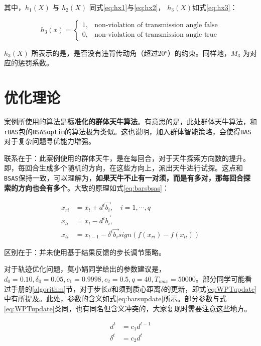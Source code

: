 \documentclass[]{ctexbook}
\theoremstyle{definition}
\theoremstyle{definition}
\theoremstyle{definition}
\theoremstyle{remark}
\begin{document}
其中，\(h_1(X)\) 与 \(h_2(X)\) 同式\eqref{eq:hx1}与\eqref{eq:hx2}，
\(h_3(X)\)如式\eqref{eq:hx3}：

\begin{equation}
h_3(x) = \begin{cases}
1, & \text{non-violation of transmission angle false}\\
0, & \text{non-violation of transmission angle true}
\end{cases}
\label{eq:hx3}
\end{equation}

\(h_3(X)\)
所表示的是，是否没有违背传动角（超过20°）的约束。同样地，\(M_3\)
为对应的惩罚系数。

\section{优化理论}

案例所使用的算法是\textbf{标准化的群体天牛算法}。有意思的是，此处群体天牛算法，和\texttt{rBAS}包的\texttt{BSASoptim}的算法极为类似。这也说明，加入群体智能策略，会使得\texttt{BAS}对于复杂问题寻优能力增强。

联系在于：此案例使用的群体天牛，是在每回合，对于天牛探索方向数的提升。即，每回合生成多个随机的方向，在这些方向上，派出天牛进行试探。这点和\texttt{BSAS}保持一致，可以理解为，\textbf{如果天牛不止有一对须，而是有多对，那每回合探索的方向也会有多个}。大致的原理如式\eqref{eq:barsbsas}：

\begin{equation}
\begin{split}
x_{ri} &= x_{t} + d^t\overrightarrow{b_i}, \quad i = 1,\cdots,q\\
x_{li} &= x_{t} - d^t\overrightarrow{b_i}, \\
x_{ti} &= x_{t-1} - \delta^t\overrightarrow{b_i}sign(f(x_{ri})-f(x_{li}))
\end{split}
\label{eq:barsbsas}
\end{equation}

区别在于：并未使用基于结果反馈的步长调节策略。

对于轨迹优化问题，莫小娟同学给出的参数建议是，\(d_0 = 0.10,\delta_0=0.05,c_1=0.9998,c_2=0.5,q=40,T_{max}=50000\)。部分同学可能看过手册的\ref{algorithm}节，对于步长\(d\)和须到质心距离\(\delta\)的更新，即式\eqref{eq:WPTupdate}中有所提及。此处，参数的含义如式\eqref{eq:barsupdate}所示。部分参数与式\eqref{eq:WPTupdate}类同，也有同名但含义冲突的，大家复现时需要注意这些地方。

\begin{equation}
\begin{split}
d^t &= c_1d^{t-1}\\
\delta^t&=c_2 d^t\\
\end{split}
\label{eq:barsupdate} 
\end{equation}
\end{document}
